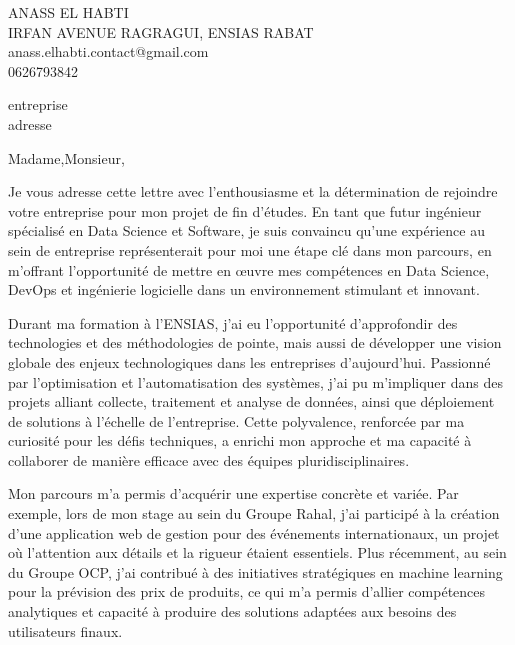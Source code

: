 \documentclass[a4paper,11pt]{letter}
\begin{document}
ANASS EL HABTI \\
IRFAN AVENUE RAGRAGUI, ENSIAS RABAT \\
anass.elhabti.contact@gmail.com \\
0626793842\\

\vspace{1cm} %

\hfill
\begin{minipage}[t]{0.5\textwidth}
\raggedleft
{entreprise} \\ %
{adresse} \\    %
\end{minipage}

Madame,Monsieur,

Je vous adresse cette lettre avec l'enthousiasme et la détermination de rejoindre votre entreprise pour mon projet de fin d'études. En tant que futur ingénieur spécialisé en Data Science et Software, je suis convaincu qu'une expérience au sein de {entreprise} représenterait pour moi une étape clé dans mon parcours, en m’offrant l’opportunité de mettre en œuvre mes compétences en Data Science, DevOps et ingénierie logicielle dans un environnement stimulant et innovant.

Durant ma formation à l’ENSIAS, j’ai eu l’opportunité d’approfondir des technologies et des méthodologies de pointe, mais aussi de développer une vision globale des enjeux technologiques dans les entreprises d’aujourd’hui. Passionné par l’optimisation et l’automatisation des systèmes, j’ai pu m’impliquer dans des projets alliant collecte, traitement et analyse de données, ainsi que déploiement de solutions à l’échelle de l’entreprise. Cette polyvalence, renforcée par ma curiosité pour les défis techniques, a enrichi mon approche et ma capacité à collaborer de manière efficace avec des équipes pluridisciplinaires.

Mon parcours m’a permis d’acquérir une expertise concrète et variée. Par exemple, lors de mon stage au sein du Groupe Rahal, j'ai participé à la création d'une application web de gestion pour des événements internationaux, un projet où l’attention aux détails et la rigueur étaient essentiels. Plus récemment, au sein du Groupe OCP, j’ai contribué à des initiatives stratégiques en machine learning pour la prévision des prix de produits, ce qui m’a permis d’allier compétences analytiques et capacité à produire des solutions adaptées aux besoins des utilisateurs finaux.
\end{document}
